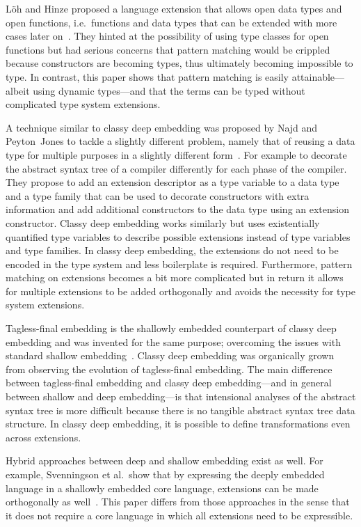 \documentclass[runningheads]{llncs}
\begin{document}
L\"oh and Hinze proposed a language extension that allows open data types and open functions, i.e.\ functions and data types that can be extended with more cases later on~\cite{loh_open_2006}.
They hinted at the possibility of using type classes for open functions but had serious concerns that pattern matching would be crippled because constructors are becoming types, thus ultimately becoming impossible to type.
In contrast, this paper shows that pattern matching is easily attainable---albeit using dynamic types---and that the terms can be typed without complicated type system extensions.

A technique similar to classy deep embedding was proposed by Najd and Peyton~Jones to tackle a slightly different problem, namely that of reusing a data type for multiple purposes in a slightly different form~\cite{najd_trees_2017}.
For example to decorate the abstract syntax tree of a compiler differently for each phase of the compiler.
They propose to add an extension descriptor as a type variable to a data type and a type family that can be used to decorate constructors with extra information and add additional constructors to the data type using an extension constructor.
Classy deep embedding works similarly but uses existentially quantified type variables to describe possible extensions instead of type variables and type families.
In classy deep embedding, the extensions do not need to be encoded in the type system and less boilerplate is required.
Furthermore, pattern matching on extensions becomes a bit more complicated but in return it allows for multiple extensions to be added orthogonally and avoids the necessity for type system extensions.

Tagless-final embedding is the shallowly embedded counterpart of classy deep embedding and was invented for the same purpose; overcoming the issues with standard shallow embedding~\cite{carette_finally_2009}.
Classy deep embedding was organically grown from observing the evolution of tagless-final embedding.
The main difference between tagless-final embedding and classy deep embedding---and in general between shallow and deep embedding---is that intensional analyses of the abstract syntax tree is more difficult because there is no tangible abstract syntax tree data structure.
In classy deep embedding, it is possible to define transformations even across extensions.

Hybrid approaches between deep and shallow embedding exist as well.
For example, Svenningson et al.\ show that by expressing the deeply embedded language in a shallowly embedded core language, extensions can be made orthogonally as well~\cite{svenningsson_combining_2013}.
This paper differs from those approaches in the sense that it does not require a core language in which all extensions need to be expressible.
\end{document}
